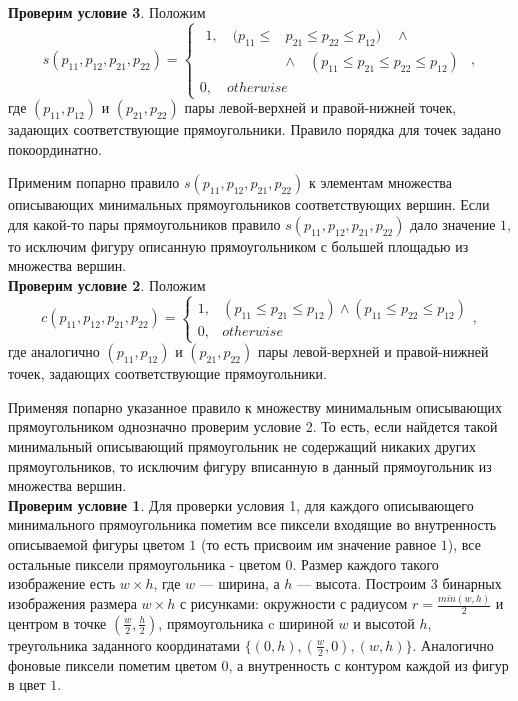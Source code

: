 \documentclass[makeidx, a4paper, 14pt]{extarticle}
\begin{document}
\textbf{Проверим условие 3}.
Положим \[
    s(p_{11}, p_{12}, p_{21}, p_{22}) = \begin{cases}
        \begin{split}
        1, \quad (p_{11} \le & p_{21} \le p_{22} \le p_{12}) \quad \wedge \\
            & \wedge \quad (p_{11} \le p_{21} \le p_{22} \le p_{12})
        \end{split} \\
        0, \quad otherwise
    \end{cases},
\]
где ${(p_{11}, p_{12})}$ и ${(p_{21}, p_{22})}$ пары левой-верхней и правой-нижней точек, задающих соответствующие прямоугольники.
Правило порядка для точек задано покоординатно.

Применим попарно правило ${s(p_{11}, p_{12}, p_{21}, p_{22})}$ к элементам множества описывающих минимальных прямоугольников соответствующих
вершин. Если для какой-то пары прямоугольников правило ${s(p_{11}, p_{12}, p_{21}, p_{22})}$ дало значение $1$, то исключим фигуру описанную
прямоугольником с большей площадью из множества вершин. \\

\textbf{Проверим условие 2}.
Положим \[
    c(p_{11}, p_{12}, p_{21}, p_{22}) = \begin{cases}
        1, &(p_{11} \leq p_{21} \leq p_{12}) \wedge (p_{11} \le p_{22} \le p_{12}) \\
        0, &otherwise
    \end{cases},
\]
где аналогично ${(p_{11}, p_{12})}$ и $({p_{21}, p_{22}})$ пары левой-верхней и правой-нижней точек, задающих соответствующие прямоугольники.

Применяя попарно указанное правило к множеству минимальным описывающих прямоугольником однозначно проверим условие 2.
То есть, если найдется такой минимальный описывающий прямоугольник не содержащий никаких других прямоугольников, то исключим фигуру вписанную в данный прямоугольник
из множества вершин. \\

\textbf{Проверим условие 1}.
Для проверки условия 1, для каждого описывающего минимального прямоугольника пометим все пиксели входящие во внутренность описываемой фигуры цветом $1$ (то есть присвоим им значение равное $1$),
все остальные пиксели прямоугольника - цветом $0$. Размер каждого такого изображение есть ${w \times h}$, где $w$ --- ширина, а $h$ --- высота.
Построим 3 бинарных изображения размера $w \times h$ с рисунками: окружности с радиусом ${r = \frac{min(w, h)}{2}}$ и центром в точке ${(\frac{w}{2}, \frac{h}{2})}$, прямоугольника c шириной $w$ и высотой $h$,
треугольника заданного координатами ${\{(0, h), (\frac{w}{2}, 0), (w, h)\}}$. Аналогично фоновые пиксели пометим цветом $0$, а внутренность с контуром каждой из фигур в цвет $1$.
\end{document}
